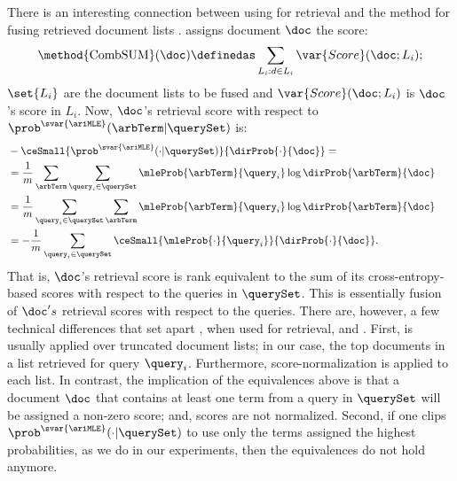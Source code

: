 There is an interesting connection between using \method{\ariMLE} for
retrieval and the  method for fusing retrieved document lists
\cite{fox1994combination}.  assigns document $\doc$ the score:
\begin{equation}
  \label{eq:combsum}
  \mbox{\method{CombSUM}} (\doc) \definedas \sum_{L_i: d \in L_i}\var{Score}(\doc;L_i);
\end{equation}
 $\set{L_i}$ are the document lists to be fused and $\var{Score}(\doc;L_i)$ is $\doc$'s score in $L_i$.
Now, $\doc$'s retrieval score with respect to
$\prob^{\svar{\ariMLE}}(\arbTerm|\querySet)$ is:
\begin{align}
& -\ceSmall{\prob^{\svar{\ariMLE}}(\cdot|\querySet)}{\dirProb{\cdot}{\doc}} = \qquad \qquad \qquad \qquad \qquad \quad \\
& = \frac{1}{m}  \sum_{\arbTerm} \sum_{\query_i \in \querySet} \mleProb{\arbTerm} {\query_i}\log \dirProb{\arbTerm}{\doc} \notag \\ 
& = \frac{1}{m} \sum_{\query_i \in \querySet} \sum_{\arbTerm} \mleProb{\arbTerm} {\query_i}\log \dirProb{\arbTerm}{\doc} \notag \\
& = - \frac{1}{m}  \sum_{\query_i \in \querySet} \ceSmall{\mleProb{\cdot}{\query_i}}{\dirProb{\cdot}{\doc}}. \notag
\end{align}
That is, $\doc$'s retrieval score is rank equivalent to the sum of
its cross-entropy-based scores with respect to the queries in
$\querySet$.
This is essentially {\combsum} fusion of $\doc's$ retrieval scores
with respect to the queries.
There are, however, a few technical differences that set apart
\method{\ariMLE}, when used for retrieval, and {\combsum}.
First, {\combsum} is usually applied over truncated document lists;
in our case, the top documents in a list retrieved for query
$\query_i$.
Furthermore, score-normalization is applied to each list.
In contrast, the implication of the equivalences above is that a
document $\doc$ that contains at least one term from a query in
$\querySet$ will be assigned a non-zero score; and, scores are not
normalized.
Second, if one clips $\prob^{\svar{\ariMLE}}(\cdot|\querySet)$ to
use only the terms assigned the highest probabilities, as we do in
our experiments, then the equivalences do not hold anymore.


